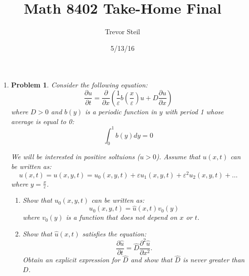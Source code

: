 \documentclass[a4paper]{article}
\title{Math 8402 Take-Home Final }
\date{5/13/16}
\author{Trevor Steil}
\newtheorem*{problem}{Problem}
\begin{document}
\maketitle
\begin{enumerate}
  \item
    \begin{problem}
      Consider the following equation:
      \begin{equation}
        \frac{\partial u}{\partial t} = \frac{\partial}{\partial x} \left( \frac{1}{\varepsilon} b \left( \frac{x}{\varepsilon} \right) u + D
        \frac{\partial u}{\partial x} \right)
        \label{eqn:prob1_1}
      \end{equation}
      where $D>0$ and $b(y)$ is a periodic function in $y$ with period 1 whose average is equal to 0:
      \begin{equation}
        \int_{0}^{1} b(y) dy = 0
        \label{eqn:prob1_2}
      \end{equation}

      We will be interested in positive soltuions ($u>0$). Assume that $u(x,t)$ can be written as:
      \begin{equation}
        u(x,t) = u(x,y,t) = u_0(x,y,t) + \varepsilon u_1(x,y,t) + \varepsilon^2 u_2(x,y,t) + \dots
        \label{eqn:prob1_3}
      \end{equation}
      where $y = \frac{x}{\varepsilon} $.

      \begin{enumerate}
        \item Show that $u_0(x,y,t)$ can be written as:
          \begin{equation}
            u_0(x,y,t) = \widehat{u} (x,t) v_0(y)
            \label{eqn:prob1_4}
          \end{equation}
          where $v_0(y)$ is a function that does not depend on $x$ or $t$.

        \item Show that $\widehat{u}(x,t)$ satisfies the equation:
          \begin{equation}
            \frac{\partial \widehat{u}}{\partial t} = \widehat{D} \frac{\partial^2 \widehat{u}}{\partial x^2} .
            \label{eqn:prob1_5}
          \end{equation}
          Obtain an explicit expression for $\widehat{D}$ and show that $\widehat{D}$ is never greater than $D$.

      \end{enumerate}


\end{problem}
\end{enumerate}
\end{document}
